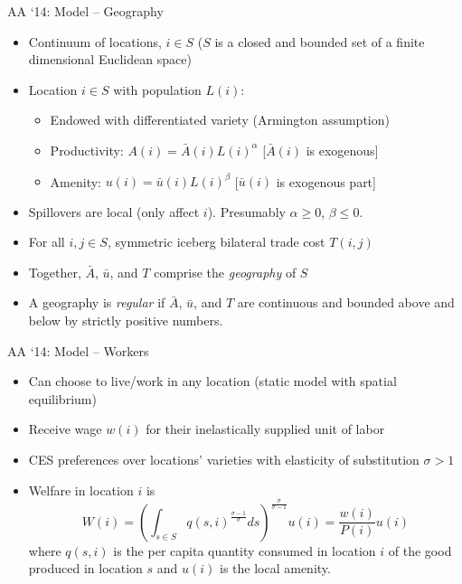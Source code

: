 \documentclass[11pt,notes=hide,aspectratio=169]{beamer}
\begin{document}
\begin{frame}{AA `14: Model -- Geography}
\begin{itemize}
\item Continuum of locations, $i \in S$ ($S$ is a closed and bounded set of a finite dimensional Euclidean space) 
\item Location $i \in S$ with population $L(i)$:
\begin{itemize}
\item Endowed with differentiated variety (Armington assumption)
\item Productivity: $A(i) = \bar{A}(i) L(i)^\alpha$ [$\bar{A}(i)$ is exogenous]
\item Amenity: $u(i) = \bar{u}\left(i\right) L(i)^\beta $ [$\bar{u}(i)$ is exogenous part]
\end{itemize}
\item Spillovers are local (only affect $i$). Presumably $\alpha \geq 0$, $\beta \leq 0$.
\item For all $i,j \in S$, symmetric iceberg bilateral trade cost $T\left(i,j\right)$
\item Together, $\bar{A}$, $\bar{u}$, and $T$ comprise the \textit{geography} of $S$
\item A geography is \textit{regular} if $\bar{A}$, $\bar{u}$, and $T$ are continuous and bounded above and below by strictly positive numbers.
\end{itemize}
\end{frame}
\begin{frame}{AA `14: Model -- Workers}
\begin{itemize}
\item Can choose to live/work in any location (static model with spatial equilibrium)
\item Receive wage $w\left(i\right)$ for their inelastically supplied unit of labor
\item CES preferences over locations' varieties with elasticity of substitution $\sigma>1$
\item Welfare in location $i$ is
\begin{equation*}
W\left(i\right)
=
\left(\int_{s\in S}q\left(s,i\right)^{\frac{\sigma-1}{\sigma}}ds\right)^{\frac{\sigma}{\sigma-1}}u\left(i\right)
=
\frac{w(i)}{P(i)}u(i)
\end{equation*}
 where $q\left(s,i\right)$ is the per capita quantity consumed in location $i$ of the good produced in location $s$ and $u\left(i\right)$ is the local amenity.
\end{itemize}
\end{frame}
\end{document}
